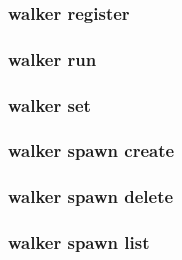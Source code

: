 \subsubsection{walker register}

\subsubsection{walker run}

\subsubsection{walker set}

\subsubsection{walker spawn create}

\subsubsection{walker spawn delete}

\subsubsection{walker spawn list}

